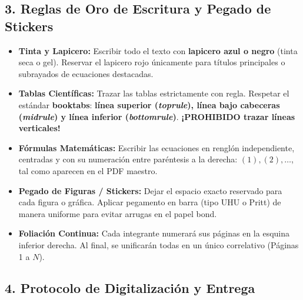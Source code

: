 \documentclass[a4paper, 10pt]{article}
\begin{document}
\vspace{0.15cm}

\subsection*{\color{uni-blue}3. Reglas de Oro de Escritura y Pegado de Stickers}

\begin{tcolorbox}[title=Normas de Formato y Presentación de Cátedra, colframe=uni-blue]
    \footnotesize
    \begin{itemize}[leftmargin=1.5em, itemsep=2.5pt]
        \item \textbf{Tinta y Lapicero:} Escribir todo el texto con \textbf{lapicero azul o negro} (tinta seca o gel). Reservar el lapicero rojo únicamente para títulos principales o subrayados de ecuaciones destacadas.
        \item \textbf{Tablas Científicas:} Trazar las tablas estrictamente con regla. Respetar el estándar \textbf{booktabs}: \textbf{línea superior (\textit{toprule}), línea bajo cabeceras (\textit{midrule}) y línea inferior (\textit{bottomrule})}. \textbf{¡PROHIBIDO trazar líneas verticales!}
        \item \textbf{Fórmulas Matemáticas:} Escribir las ecuaciones en renglón independiente, centradas y con su numeración entre paréntesis a la derecha: $(1), (2), \dots$, tal como aparecen en el PDF maestro.
        \item \textbf{Pegado de Figuras / Stickers:} Dejar el espacio exacto reservado para cada figura o gráfica. Aplicar pegamento en barra (tipo UHU o Pritt) de manera uniforme para evitar arrugas en el papel bond.
        \item \textbf{Foliación Continua:} Cada integrante numerará sus páginas en la esquina inferior derecha. Al final, se unificarán todas en un único correlativo (Páginas 1 a $N$).
    \end{itemize}
\end{tcolorbox}

\vspace{0.15cm}

\subsection*{\color{uni-blue}4. Protocolo de Digitalización y Entrega}
\end{document}
